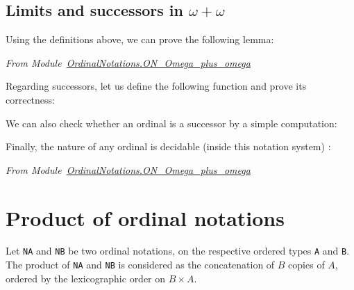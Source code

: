 \subsection{Limits and successors in \texorpdfstring{$\omega+\omega$}{omega+omega}}

Using the definitions above, we can prove the following lemma:

\vspace{4pt}

\noindent\emph{From Module~\href{../theories/html/hydras.OrdinalNotations.ON_Omega_plus_omega.html}{OrdinalNotations.ON\_Omega\_plus\_omega}}



\vspace{4pt}

Regarding successors, let us define the following function and prove its correctness:






\vspace{4pt}



We can also check whether an ordinal is a successor by a simple computation:



\vspace{4pt}

Finally, the nature of any ordinal is decidable (inside this notation system) :



\noindent\emph{From Module~\href{../theories/html/hydras.OrdinalNotations.ON_Omega_plus_omega.html}{OrdinalNotations.ON\_Omega\_plus\_omega}}



\section{Product of ordinal notations}

Let \texttt{NA} and \texttt{NB} be two ordinal notations, on the respective  ordered types \texttt{A} and \texttt{B}. The product of \texttt{NA} and \texttt{NB} is considered as the concatenation of $B$ copies of $A$, ordered by the lexicographic order on $B\times A$.

